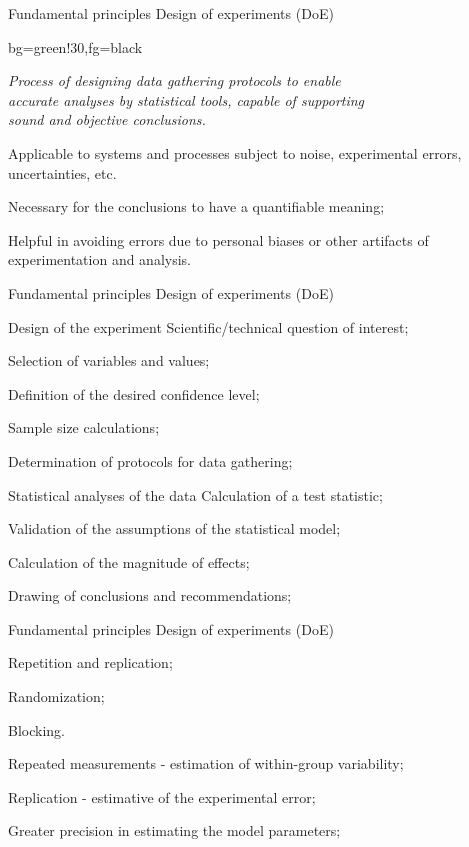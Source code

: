\documentclass[t]{beamer}
\begin{document}

\begin{ftst}
{Fundamental principles}
{Design of experiments (DoE)}
\vone
\begin{colorblock}{}{bg=green!30,fg=black}
\begin{center}
\textit{Process of designing data gathering protocols to enable\\
accurate analyses by statistical tools, capable of supporting\\
sound and objective conclusions.}
\end{center}
\end{colorblock}

\bitems Applicable to systems and processes subject to noise, experimental errors, uncertainties, etc.
	\item Necessary for the conclusions to have a quantifiable meaning;
	\item Helpful in avoiding errors due to personal biases or other artifacts of experimentation and analysis.
\eitem
\end{ftst}


\begin{ftst}
{Fundamental principles}
{Design of experiments (DoE)}
\begin{block}{Design of the experiment}
	\small
	\bitems Scientific/technical question of interest;
		\item Selection of variables and values;
		\item Definition of the desired confidence level;
		\item Sample size calculations;
		\item Determination of protocols for data gathering;
	\eitem
\end{block}
\begin{block}{Statistical analyses of the data}
	\small
	\bitems Calculation of a test statistic;
		\item Validation of the assumptions of the statistical model;
		\item Calculation of the magnitude of effects;
		\item Drawing of conclusions and recommendations;
	\eitem
\end{block}
\end{ftst}


\begin{ftst}
{Fundamental principles}
{Design of experiments (DoE)}
\begin{block}{}
	\bitems \alert{Repetition and replication};
		\item Randomization;
		\item Blocking.
	\eitem
\end{block}
	\bitems Repeated measurements - estimation of within-group variability;
		\item Replication - estimative of the experimental error;
		\item Greater precision in estimating the model parameters;
	\eitem
\end{ftst}
\end{document}
